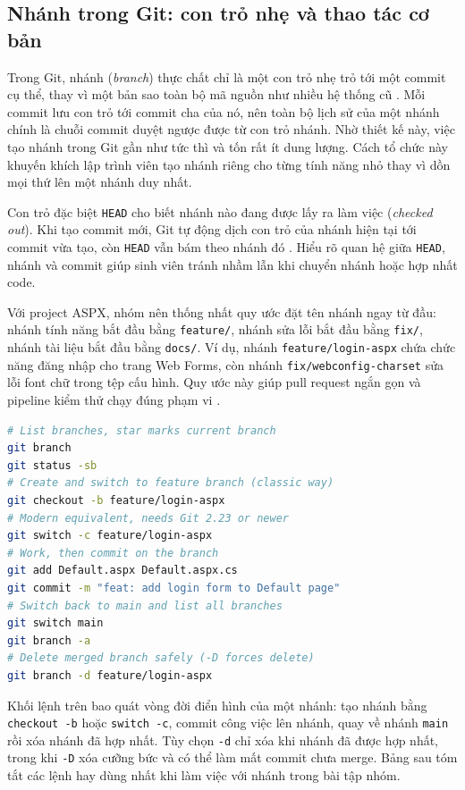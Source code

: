 \subsection{Nhánh trong Git: con trỏ nhẹ và thao tác cơ bản}

Trong Git, nhánh (\textit{branch}) thực chất chỉ là một con trỏ nhẹ trỏ tới một commit cụ thể, thay vì một bản sao toàn bộ mã nguồn như nhiều hệ thống cũ \cite{progit}. Mỗi commit lưu con trỏ tới commit cha của nó, nên toàn bộ lịch sử của một nhánh chính là chuỗi commit duyệt ngược được từ con trỏ nhánh. Nhờ thiết kế này, việc tạo nhánh trong Git gần như tức thì và tốn rất ít dung lượng. Cách tổ chức này khuyến khích lập trình viên tạo nhánh riêng cho từng tính năng nhỏ thay vì dồn mọi thứ lên một nhánh duy nhất.

Con trỏ đặc biệt \verb|HEAD| cho biết nhánh nào đang được lấy ra làm việc (\textit{checked out}). Khi tạo commit mới, Git tự động dịch con trỏ của nhánh hiện tại tới commit vừa tạo, còn \verb|HEAD| vẫn bám theo nhánh đó \cite{atlassiangit}. Hiểu rõ quan hệ giữa \verb|HEAD|, nhánh và commit giúp sinh viên tránh nhầm lẫn khi chuyển nhánh hoặc hợp nhất code.

Với project ASPX, nhóm nên thống nhất quy ước đặt tên nhánh ngay từ đầu: nhánh tính năng bắt đầu bằng \verb|feature/|, nhánh sửa lỗi bắt đầu bằng \verb|fix/|, nhánh tài liệu bắt đầu bằng \verb|docs/|. Ví dụ, nhánh \verb|feature/login-aspx| chứa chức năng đăng nhập cho trang Web Forms, còn nhánh \verb|fix/webconfig-charset| sửa lỗi font chữ trong tệp cấu hình. Quy ước này giúp pull request ngắn gọn và pipeline kiểm thử chạy đúng phạm vi \cite{gitflow}.

\begin{lstlisting}[language=bash, caption={Tạo và quản lý nhánh tính năng}, label={lst:c23-branch}]
# List branches, star marks current branch
git branch
git status -sb
# Create and switch to feature branch (classic way)
git checkout -b feature/login-aspx
# Modern equivalent, needs Git 2.23 or newer
git switch -c feature/login-aspx
# Work, then commit on the branch
git add Default.aspx Default.aspx.cs
git commit -m "feat: add login form to Default page"
# Switch back to main and list all branches
git switch main
git branch -a
# Delete merged branch safely (-D forces delete)
git branch -d feature/login-aspx
\end{lstlisting}

Khối lệnh trên bao quát vòng đời điển hình của một nhánh: tạo nhánh bằng \verb|checkout -b| hoặc \verb|switch -c|, commit công việc lên nhánh, quay về nhánh \verb|main| rồi xóa nhánh đã hợp nhất. Tùy chọn \verb|-d| chỉ xóa khi nhánh đã được hợp nhất, trong khi \verb|-D| xóa cưỡng bức và có thể làm mất commit chưa merge. Bảng sau tóm tắt các lệnh hay dùng nhất khi làm việc với nhánh trong bài tập nhóm.

